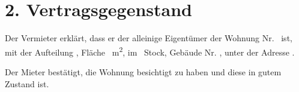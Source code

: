\section*{2. Vertragsgegenstand}
Der Vermieter erklärt, dass er der alleinige Eigentümer der Wohnung Nr. \Propunitnumber\ ist, mit der Aufteilung \Propdisposition, Fläche \Propaream~m\textsuperscript{2}, im \Propfloor\ Stock, Gebäude Nr. \Propbuildingnumber, unter der Adresse \Propaddress.

Der Mieter bestätigt, die Wohnung besichtigt zu haben und diese in gutem Zustand ist.
